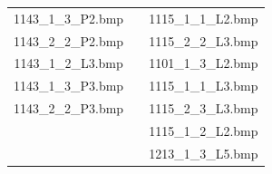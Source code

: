 \begin{table}[ht]
\begin{tabular}{ | c | c | c | }
      1143\_1\_3\_P2.bmp &                 & 1115\_1\_1\_L2.bmp     \\
      1143\_2\_2\_P2.bmp &                 & 1115\_2\_2\_L3.bmp     \\
      1143\_1\_2\_L3.bmp &                 & 1101\_1\_3\_L2.bmp     \\
      1143\_1\_3\_P3.bmp &                 & 1115\_1\_1\_L3.bmp     \\
      1143\_2\_2\_P3.bmp &                 & 1115\_2\_3\_L3.bmp     \\
                      &                 & 1115\_1\_2\_L2.bmp        \\
                      &                 & 1213\_1\_3\_L5.bmp        \\
      \hline
    \end{tabular}
    \label{tab:subory_testov}
  \end{table}

